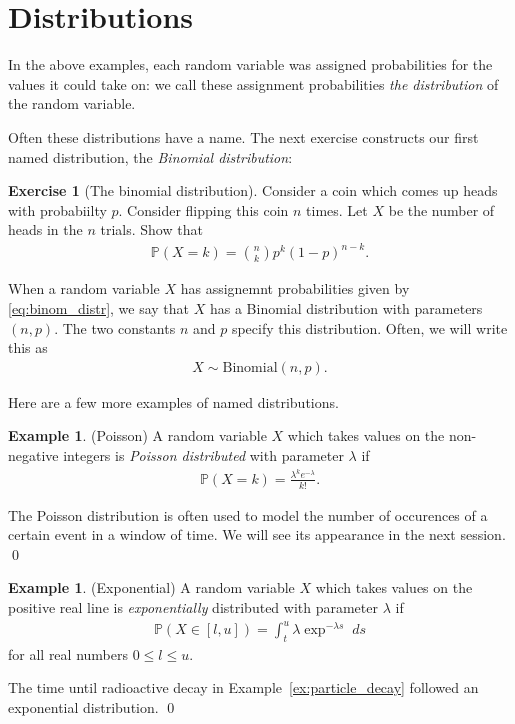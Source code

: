 \documentclass[11pt]{article}
\theoremstyle{definition}
\newtheorem{example}[theorem]{Example}
\newtheorem{exercise}[]{Exercise}
\renewcommand{\P}{\mathbb{P}}
\begin{document}
\section{Distributions}

In the above examples, each random variable was assigned probabilities for
the values it could take on: we call these assignment probabilities
\textit{the distribution} of the random variable.

Often these distributions have a name. The next exercise constructs our
first named distribution, the \textit{Binomial distribution}:

\begin{exercise}[The binomial distribution]
Consider a coin which comes up heads with probabiilty $p$.
Consider flipping this coin $n$ times. Let $X$ be the number of
heads in the $n$ trials. Show that
\begin{align}
\P(X = k) = {n \choose k} p^k (1 - p)^{n - k}.
\label{eq:binom_distr}
\end{align}

\end{exercise}

When a random variable $X$ has assignemnt probabilities given by \eqref{eq:binom_distr},
we say that $X$ has a Binomial distribution with parameters $(n, p)$. The two constants
$n$ and $p$ specify this distribution. Often, we will write this as
\begin{align*}
  X\sim\text{Binomial}(n, p).
\end{align*}

Here are a few more examples of named distributions.

\begin{example}(Poisson)
A random variable $X$ which takes values on the non-negative integers is
\textit{Poisson distributed} with parameter $\lambda$ if
\begin{align*}
  \P(X = k) = \frac{\lambda^k e^{-\lambda}}{k!}.
\end{align*}

The Poisson distribution is often used to model the number of occurences
of a certain event in a window of time. We will see its appearance in the next session.
\qed
\end{example}

\begin{example}(Exponential)
A random variable $X$ which takes values on the positive real line is
\textit{exponentially} distributed with parameter $\lambda$ if
\begin{align}
  \P(X \in [l, u]) =
  \int_{t}^u \lambda \exp^{-\lambda s} \;ds
  \label{eq:exponential}
\end{align}
for all real numbers $0 \leq l \leq u$.

The time until radioactive decay in Example~\ref{ex:particle_decay}
followed an exponential distribution.
\qed
\end{example}
\end{document}
